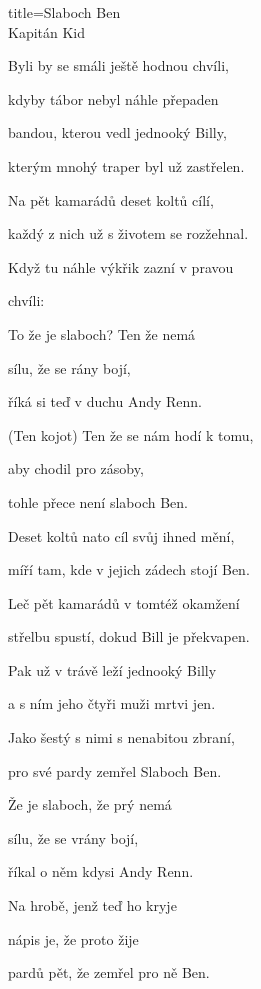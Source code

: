 \begin{song}{title=\centering Slaboch Ben \\\normalsize Kapitán Kid  \vspace*{-0.3cm}}
{\begin{minipage}[t]{0.48\textwidth}
\sloka
	Byli by se smáli ještě hodnou chvíli,
	
	kdyby tábor nebyl náhle přepaden
	
	bandou, kterou vedl jednooký Billy,
	
	kterým mnohý traper byl už zastřelen.
	
	Na pět kamarádů deset koltů cílí,
	
	každý z nich už s životem se rozžehnal.

	Když tu náhle výkřik zazní v pravou 
	
	chvíli:
	
	
	To že je slaboch? Ten že nemá
	
	sílu, že se rány bojí,
	
	říká si teď v duchu Andy Renn.
	
	(Ten kojot) Ten že se nám hodí k tomu,
	
	aby chodil pro zásoby,
	
	tohle přece není slaboch Ben.

\sloka
	Deset koltů nato cíl svůj ihned mění,
	
	míří tam, kde v jejich zádech stojí Ben.

	Leč pět kamarádů v tomtéž okamžení
	
	střelbu spustí, dokud Bill je překvapen.
	
	Pak už v trávě leží jednooký Billy
	
	a s ním jeho čtyři muži mrtvi jen.
	
	Jako šestý s nimi s nenabitou zbraní,
	
	pro své pardy zemřel Slaboch Ben.

	Že je slaboch, že prý nemá
	
	sílu, že se vrány bojí,
	
	říkal o něm kdysi Andy Renn.
	
	Na hrobě, jenž teď ho kryje
	
	nápis je, že proto žije
	
	pardů pět, že zemřel pro ně Ben.
\end{minipage}
}
\setcounter{Slokočet}{0}
\end{song}

